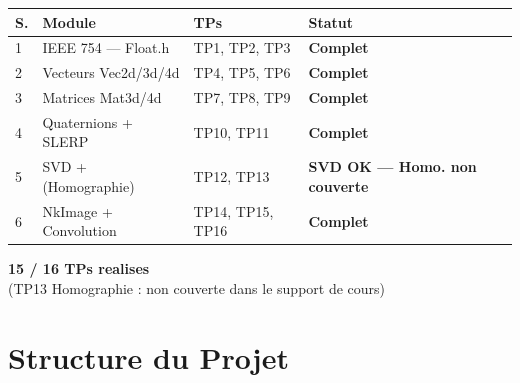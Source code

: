 \documentclass[12pt,a4paper]{report}
\begin{document}
\vspace{0.8cm}

\begin{tcolorbox}[
  colback=LightBlue, colframe=PrimaryBlue,
  arc=6pt, boxrule=1pt,
  title={\bfseries Bilan global des TPs},
  coltitle=white
]
\centering
\renewcommand{\arraystretch}{1.4}
\begin{tabular}{C{1.2cm}lC{2.5cm}C{2.5cm}}
  \toprule
  \textbf{S.} & \textbf{Module} & \textbf{TPs} & \textbf{Statut} \\
   & IEEE 754 --- Float.h        & TP1, TP2, TP3  & \textcolor{green!60!black}{\bfseries Complet} \\
  2 & Vecteurs Vec2d/3d/4d        & TP4, TP5, TP6  & \textcolor{green!60!black}{\bfseries Complet} \\
  3 & Matrices Mat3d/4d           & TP7, TP8, TP9  & \textcolor{green!60!black}{\bfseries Complet} \\
  4 & Quaternions + SLERP         & TP10, TP11     & \textcolor{green!60!black}{\bfseries Complet} \\
  5 & SVD + (Homographie)         & TP12, TP13     & \textcolor{orange!80!black}{\bfseries SVD OK --- Homo. non couverte} \\
  6 & NkImage + Convolution       & TP14, TP15, TP16 & \textcolor{green!60!black}{\bfseries Complet} \\
  \bottomrule
\end{tabular}
\end{tcolorbox}

\vspace{0.8cm}

\begin{center}
\begin{tcolorbox}[
  width=0.65\linewidth,
  colback=LightGreen, colframe=green!50!black,
  arc=6pt, boxrule=1pt
]
\centering
{\large\bfseries\color{green!40!black} 15 / 16 TPs realises}\\[4pt]
{\small\color{DarkGray} (TP13 Homographie : non couverte dans le support de cours)}
\end{tcolorbox}
\end{center}

\appendix
\chapter{Structure du Projet}
\end{document}

